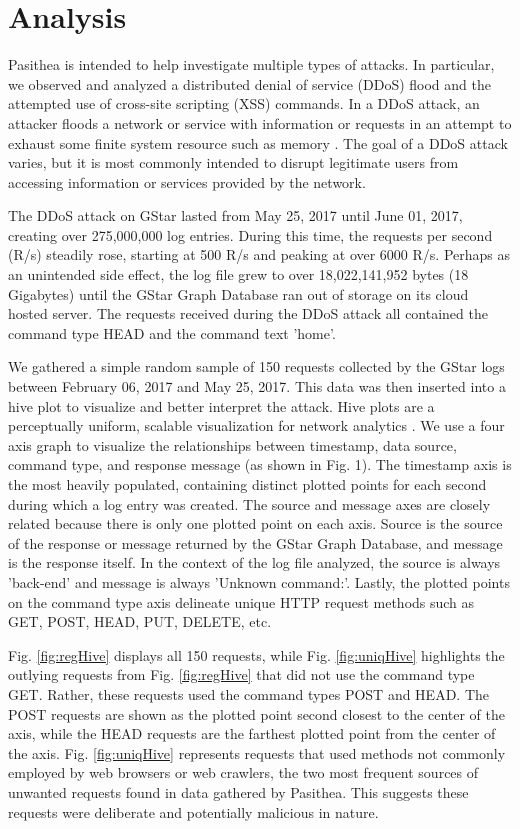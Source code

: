 
\section{Analysis} \label{analysis}

Pasithea is intended to help investigate multiple types of attacks.  In particular, we observed and analyzed a distributed denial of service (DDoS) flood and the attempted use of cross-site scripting (XSS) commands. In a DDoS attack, an attacker floods a network or service with information or requests in an attempt to exhaust some finite system resource such as memory \cite{DoS-Def}. The goal of a DDoS attack varies, but it is most commonly intended to disrupt legitimate users from accessing information or services provided by the network.

The DDoS attack on GStar lasted from May 25, 2017 until June 01, 2017, creating over 275,000,000 log entries. During this time, the requests per second (R/s) steadily rose, starting at 500 R/s and peaking at over 6000 R/s. Perhaps as an unintended side effect, the log file grew to over 18,022,141,952 bytes (18 Gigabytes) until the GStar Graph Database ran out of storage on its cloud hosted server. The requests received during the DDoS attack all contained the command type HEAD and the command text 'home'.

We gathered a simple random sample of 150 requests collected by the GStar logs between February 06, 2017 and May 25, 2017.  This data was then inserted into a hive plot to visualize and better interpret the attack. Hive plots are a perceptually uniform, scalable visualization for network analytics \cite{Hive-Plot}.  We use a four axis graph to visualize the relationships between timestamp, data source, command type, and response message (as shown in Fig. 1). The timestamp axis is the most heavily populated, containing distinct plotted points for each second during which a log entry was created. The source and message axes are closely related because there is only one plotted point on each axis. Source is the source of the response or message returned by the GStar Graph Database, and message is the response itself. In the context of the log file analyzed, the source is always 'back-end' and message is always 'Unknown command:'. Lastly, the plotted points on the command type axis delineate unique HTTP request methods such as GET, POST, HEAD, PUT, DELETE, etc.

Fig. \ref{fig:regHive} displays all 150 requests, while Fig. \ref{fig:uniqHive} highlights the outlying requests from Fig. \ref{fig:regHive} that did not use the command type GET.  Rather, these requests used the command types POST and HEAD. The POST requests are shown as the plotted point second closest to the center of the axis, while the HEAD requests are the farthest plotted point from the center of the axis. Fig. \ref{fig:uniqHive} represents requests that used methods not commonly employed by web browsers or web crawlers, the two most frequent sources of unwanted requests found in data gathered by Pasithea. This suggests these requests were deliberate and potentially malicious in nature.

